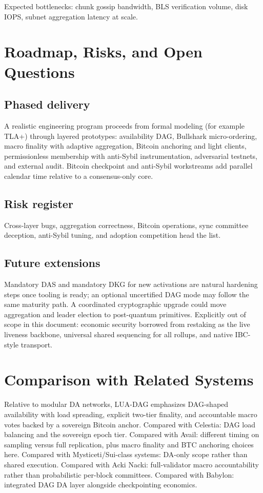 \documentclass[11pt,a4paper,twoside]{report}
\theoremstyle{definition}
\begin{document}
Expected bottlenecks: chunk gossip bandwidth, BLS verification volume, disk IOPS, subnet aggregation latency at scale.

\chapter{Roadmap, Risks, and Open Questions}

\section{Phased delivery}
A realistic engineering program proceeds from formal modeling (for example TLA+) through layered prototypes: availability DAG, Bullshark micro-ordering, macro finality with adaptive aggregation, Bitcoin anchoring and light clients, permissionless membership with anti-Sybil instrumentation, adversarial testnets, and external audit. Bitcoin checkpoint and anti-Sybil workstreams add parallel calendar time relative to a consensus-only core.

\section{Risk register}
Cross-layer bugs, aggregation correctness, Bitcoin operations, sync committee deception, anti-Sybil tuning, and adoption competition head the list.

\section{Future extensions}
Mandatory DAS and mandatory DKG for new activations are natural hardening steps once tooling is ready; an optional uncertified DAG mode may follow the same maturity path. A coordinated cryptographic upgrade could move aggregation and leader election to post-quantum primitives. Explicitly out of scope in this document: economic security borrowed from restaking as the live liveness backbone, universal shared sequencing for all rollups, and native IBC-style transport.

\chapter{Comparison with Related Systems}
Relative to modular DA networks, LUA-DAG emphasizes DAG-shaped availability with load spreading, explicit two-tier finality, and accountable macro votes backed by a sovereign Bitcoin anchor. Compared with Celestia: DAG load balancing and the sovereign epoch tier. Compared with Avail: different timing on sampling versus full replication, plus macro finality and BTC anchoring choices here. Compared with Mysticeti/Sui-class systems: DA-only scope rather than shared execution. Compared with Acki Nacki: full-validator macro accountability rather than probabilistic per-block committees. Compared with Babylon: integrated DAG DA layer alongside checkpointing economics.
\end{document}
